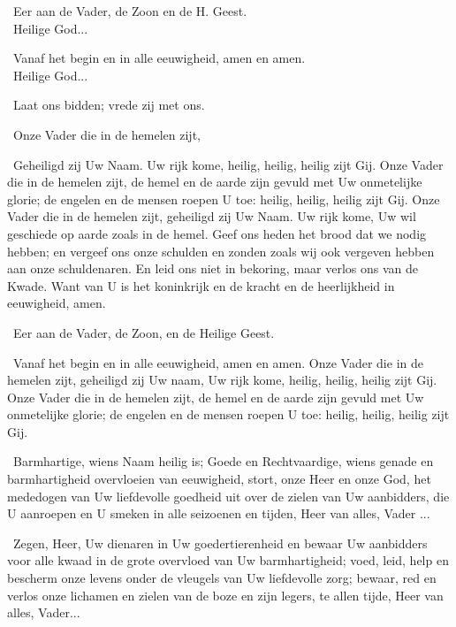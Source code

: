 \documentclass[12pt,twoside,a5paper]{article}
\begin{document}
\begin{halfparskip}
  \dd~Eer aan de Vader, de Zoon en de H. Geest.\\ \rr~Heilige God...

  \dd~Vanaf het begin en in alle eeuwigheid, amen en amen.\\ \rr~Heilige God...

  \rr~Laat ons bidden; vrede zij met ons. 

  \cc~Onze Vader die in de hemelen zijt,

  \rr~Geheiligd zij Uw Naam. Uw rijk kome, heilig, heilig, heilig zijt Gij. Onze Vader die in de hemelen zijt, de hemel en de aarde zijn gevuld met Uw onmetelijke glorie; de engelen en de mensen roepen U toe: heilig, heilig, heilig zijt Gij. Onze Vader die in de hemelen zijt, geheiligd zij Uw Naam. Uw rijk kome, Uw wil geschiede op aarde zoals in de hemel. Geef ons heden het brood dat we nodig hebben; en vergeef ons onze schulden en zonden zoals wij ook vergeven hebben aan onze schuldenaren. En leid ons niet in bekoring, maar verlos ons van de Kwade. Want van U is het koninkrijk en de kracht en de heerlijkheid in eeuwigheid, amen.

  \cc~Eer aan de Vader, de Zoon, en de Heilige Geest.

  \rr~Vanaf het begin en in alle eeuwigheid, amen en amen. Onze Vader die in de hemelen zijt, geheiligd zij Uw naam, Uw rijk kome, heilig, heilig, heilig zijt Gij. Onze Vader die in de hemelen zijt, de hemel en de aarde zijn gevuld met Uw onmetelijke glorie; de engelen en de mensen roepen U toe: heilig, heilig, heilig zijt Gij.

  \cc~Barmhartige, wiens Naam heilig is; Goede en Rechtvaardige, wiens genade en barmhartigheid overvloeien van eeuwigheid, stort, onze Heer en onze God, het mededogen van Uw liefdevolle goedheid uit over de zielen van Uw aanbidders, die U aanroepen en U smeken in alle seizoenen en tijden, Heer van alles, Vader ...

  \cc~Zegen, Heer, Uw dienaren in Uw goedertierenheid en bewaar Uw aanbidders voor alle kwaad in de grote overvloed van Uw barmhartigheid; voed, leid, help en bescherm onze levens onder de vleugels van Uw liefdevolle zorg; bewaar, red en verlos onze lichamen en zielen van de boze en zijn legers, te allen tijde, Heer van alles, Vader...
\end{halfparskip}

\end{document}
